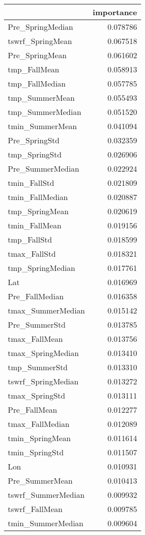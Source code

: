 \begin{tabular}{lr}
\toprule
 & importance \\
\midrule
Pre_SpringMedian & 0.078786 \\
tswrf_SpringMean & 0.067518 \\
Pre_SpringMean & 0.061602 \\
tmp_FallMean & 0.058913 \\
tmp_FallMedian & 0.057785 \\
tmp_SummerMean & 0.055493 \\
tmp_SummerMedian & 0.051520 \\
tmin_SummerMean & 0.041094 \\
Pre_SpringStd & 0.032359 \\
tmp_SpringStd & 0.026906 \\
Pre_SummerMedian & 0.022924 \\
tmin_FallStd & 0.021809 \\
tmin_FallMedian & 0.020887 \\
tmp_SpringMean & 0.020619 \\
tmin_FallMean & 0.019156 \\
tmp_FallStd & 0.018599 \\
tmax_FallStd & 0.018321 \\
tmp_SpringMedian & 0.017761 \\
Lat & 0.016969 \\
Pre_FallMedian & 0.016358 \\
tmax_SummerMedian & 0.015142 \\
Pre_SummerStd & 0.013785 \\
tmax_FallMean & 0.013756 \\
tmax_SpringMedian & 0.013410 \\
tmp_SummerStd & 0.013310 \\
tswrf_SpringMedian & 0.013272 \\
tmax_SpringStd & 0.013111 \\
Pre_FallMean & 0.012277 \\
tmax_FallMedian & 0.012089 \\
tmin_SpringMean & 0.011614 \\
tmin_SpringStd & 0.011507 \\
Lon & 0.010931 \\
Pre_SummerMean & 0.010413 \\
tswrf_SummerMedian & 0.009932 \\
tswrf_FallMean & 0.009785 \\
tmin_SummerMedian & 0.009604 \\

\end{tabular}
